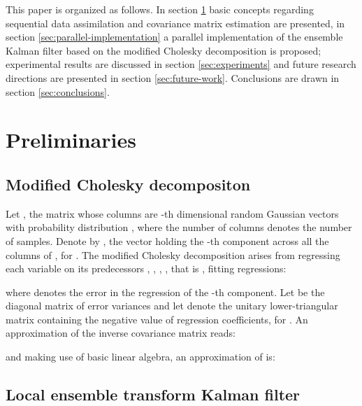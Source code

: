 \documentclass[12pt]{article}
\begin{document}
This paper is organized as follows. In section \ref{sec:preliminaries} basic concepts regarding sequential data assimilation and covariance matrix estimation are presented, in section \ref{sec:parallel-implementation}  a parallel implementation of the ensemble Kalman filter based on the modified Cholesky decomposition is proposed; experimental results are discussed in section \ref{sec:experiments} and future research directions are presented in section \ref{sec:future-work}. Conclusions are drawn in section \ref{sec:conclusions}.



\section{Preliminaries}
\label{sec:preliminaries}
\subsection{Modified Cholesky decompositon}
\label{subsec:modified-cholesky}

Let , the matrix whose columns are -th dimensional random Gaussian vectors with probability distribution , where the number of columns  denotes the number of samples. Denote by , the vector holding the -th component across all the columns of , for . The modified Cholesky decomposition \cite{modifiedCholesky} arises from regressing each variable  on its predecessors , , , , that is , fitting regressions:

where  denotes the error in the regression of the -th component. Let  be the diagonal matrix of error variances and let  denote the unitary lower-triangular matrix containing the negative value of  regression coefficients, for .
 An approximation of the inverse covariance matrix  reads:

and making use of basic linear algebra, an approximation of  is:

\subsection{Local ensemble transform Kalman filter}
\label{subsec:local-ensemble-transform}
\end{document}
